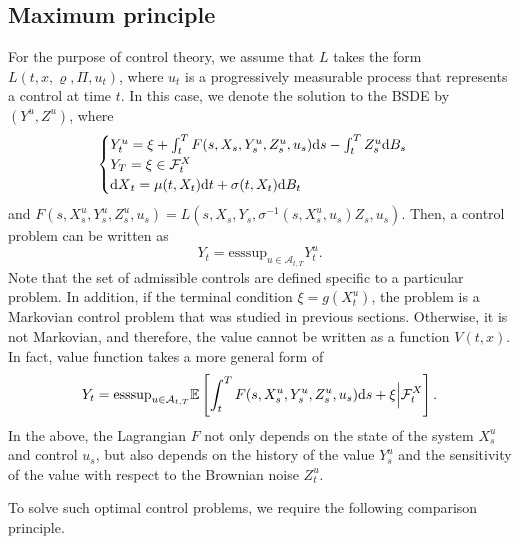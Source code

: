\documentclass[11pt]{book}
\newcommand{\dd}{\text{\normalfont d}}
\newcommand{\dt}{\text{\normalfont d}t}
\newcommand{\ds}{\text{\normalfont d}s}
\newcommand{\dX}{\text{\normalfont d}X}
\begin{document}
\subsection{Maximum principle}\label{sec:max_principle}
For the purpose of control theory, we assume that $L$ takes the form $L(t,x,\varrho,\Pi,u_t)$, where $u_t$ is a progressively measurable process that represents a control at time $t$.
In this case, we denote the solution to the BSDE by $(Y^u,Z^u)$, where  
\begin{equation}
\begin{cases}
Y^u_t=\xi+\int_t^TF(s,X_s,Y^u_s,Z^u_s,u_s){{\ds}}-\int_t^TZ^u_s{\dd}B_s\\
Y_T=\xi\in\mathcal{F}^{X}_t\\
{\dX}_t=\mu(t,X_t){{\dt}}+\sigma(t,X_t){\dd}B_t
\end{cases}
\end{equation}
and $F(s,X^u_s,Y^u_s,Z^u_s,u_s)=L(s,X_s,Y_s,\sigma^{-1}(s,X^u_s,u_s)Z_s,u_s)$.
Then, a control problem can be written as 
\begin{equation}
Y_t=\mathrm{esssup}_{u\in\mathcal{A}_{t,T}}Y_t^u.
\end{equation}
Note that the set of admissible controls are defined specific to a particular problem. In addition, if the terminal condition $\xi=g(X_t^u)$, the problem is a Markovian control problem that was studied in previous sections. Otherwise, it is not Markovian, and therefore, the value  cannot be written as a function $V(t,x)$. In fact, value function takes a more general form of 
\begin{equation}
Y_t=\mathrm{esssup}_{u\in\mathcal{A}_{t,T}}\mathbb{E}\left[\int_t^TF(s,X^u_s,Y^u_s,Z^u_s,u_s){{\ds}}+\xi\Big|\mathcal{F}^X_t\right].
\end{equation}
In the above, the Lagrangian $F$ not only depends on the state of the system $X_s^u$ and control $u_s$, but also depends on the history of the value $Y^u_s$ and the sensitivity of the value with respect to the Brownian noise $Z^u_t$.


To solve such optimal control problems, we require the following comparison principle.
\end{document}
